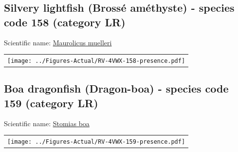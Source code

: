 \documentclass[12pt]{article}\usepackage[]{graphicx}\usepackage[]{color}
\begin{document}
\setcounter{figure}{0}

\hypertarget{sec:158}{%
\subsection{Silvery lightfish (Brossé améthyste) - species code 158 (category LR)}\label{sec:158}}

  


Scientific name: \href{http://www.marinespecies.org/aphia.php?p=taxdetails\&id=127312}{Maurolicus muelleri} \newline
\begin{minipage}{1.0\textwidth}
 \begin{tabular}{c}
\texttt{[image: ../Figures-Actual/RV-4VWX-158-presence.pdf]} \\ 
\end{tabular} 
\end{minipage}
\clearpage

\renewcommand\thefigure{\thesubsection\Alph{figure}}

\setcounter{figure}{0}

\hypertarget{sec:159}{%
\subsection{Boa dragonfish (Dragon-boa) - species code 159 (category LR)}\label{sec:159}}

  


Scientific name: \href{http://www.marinespecies.org/aphia.php?p=taxdetails\&id=127374}{Stomias boa} \newline
\begin{minipage}{1.0\textwidth}
 \begin{tabular}{c}
\texttt{[image: ../Figures-Actual/RV-4VWX-159-presence.pdf]} \\ 
\end{tabular} 
\end{minipage}
\clearpage

\renewcommand\thefigure{\thesubsection\Alph{figure}}

\setcounter{figure}{0}
\end{document}
